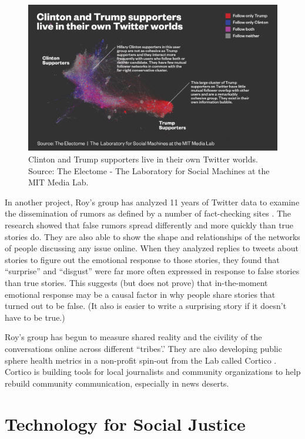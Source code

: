 \begin{figure}[h]
 \centering
 \includegraphics[width=1\textwidth]{pictures/TwitterData1-01}
 \caption[Clinton and Trump supporters live in their own Twitter worlds]{Clinton and Trump supporters live in their own Twitter worlds. Source: The Electome - The Laboratory for Social Machines at the MIT Media Lab.}
 \label{fig:electome}
\end{figure}

In another project, Roy's group has analyzed 11 years of Twitter data to examine the dissemination of rumors as defined by a number of fact-checking sites . The research showed that false rumors spread differently and more quickly  than true stories  do\cite{vosoughi2018spread}. They are also able to show the shape and relationships of the networks of people discussing any issue online. When they analyzed replies to tweets about stories to figure out the emotional response to those stories, they found that ``surprise'' and ``disgust'' were far more often expressed in response to false stories than true stories. This suggests (but does not prove) that in-the-moment emotional response may be a causal factor in why people share stories that turned out to be false. (It also is easier to write a surprising story if it doesn't have to be true.)

Roy's group has  begun to measure shared reality and the civility of the conversations online across different ``tribes'.'  They are also developing public sphere health metrics in a non-profit spin-out from the Lab called Cortico \cite{Cortico96:online}. Cortico is  building tools for local journalists and community organizations to help rebuild community communication, especially in news deserts.

\section{Technology for Social Justice}

